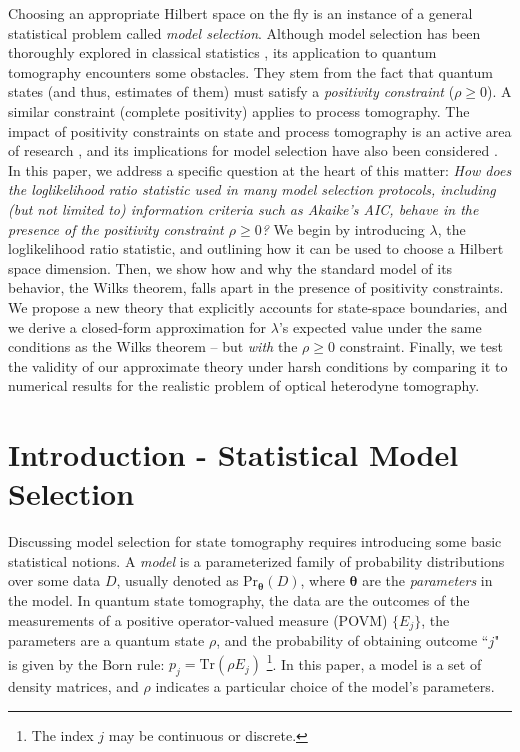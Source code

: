\documentclass[aps,pra, twocolumn]{revtex4-1}
\newcommand{\bs}[1]{\boldsymbol{#1}}
\begin{document}
Choosing an appropriate Hilbert space on the fly is an instance of a general statistical problem called \emph{model selection}.  Although model selection has been thoroughly explored in classical statistics \cite{Burnham2004}, its application to quantum tomography encounters some obstacles.  They stem from the fact that quantum states (and thus, estimates of them) must satisfy a \emph{positivity constraint} ($\rho\geq0$).  A similar constraint (complete positivity) applies to process tomography.  The impact of positivity constraints on state and process tomography is an active area of research \cite{Candes2006, Flammia2012a, Suess2016, Carpentier2015}, and its implications for model selection have also been considered \cite{Schwarz2013a, Guta2012a, VanEnk2013a, Langford2013, Yin2011, Moroder2013, Knips2015}.  In this paper, we address a specific question at the heart of this matter:  \emph{How does the loglikelihood ratio statistic used in many model selection protocols, including (but not limited to) information criteria such as Akaike's AIC, behave in the presence of the positivity constraint $\rho\geq0$?}  We begin by introducing $\lambda$, the loglikelihood ratio statistic, and outlining how it can be used to choose a Hilbert space dimension.  Then, we show how and why the standard model of its behavior, the Wilks theorem, falls apart in the presence of positivity constraints.  We propose a new theory that explicitly accounts for state-space boundaries, and we derive a closed-form approximation for $\lambda$'s expected value under the same conditions as the Wilks theorem -- but \emph{with} the $\rho\geq0$ constraint.  Finally, we test the validity of our approximate theory under harsh conditions by comparing it to numerical results for the realistic problem of optical heterodyne tomography.


\section{Introduction - Statistical Model Selection}

Discussing model selection for state tomography requires introducing some basic statistical notions.  A \emph{model} is a parameterized family of probability distributions over some data $D$, usually denoted as $\mathrm{Pr}_{\bs{\theta}}(D)$, where $\bs{\theta}$ are the \emph{parameters} in the model. In quantum state tomography, the data are the outcomes of the measurements of a positive operator-valued measure (POVM) $\{E_{j}\}$, the parameters are a quantum state $\rho$, and the probability of obtaining outcome ``$j$" is given by the Born rule: $p_{j} = \mathrm{Tr}(\rho E_{j})$ \footnote{The index $j$ may be continuous or discrete.}. In this paper, a model is a set of density matrices, and $\rho$ indicates a particular choice of the model's parameters.
\end{document}
